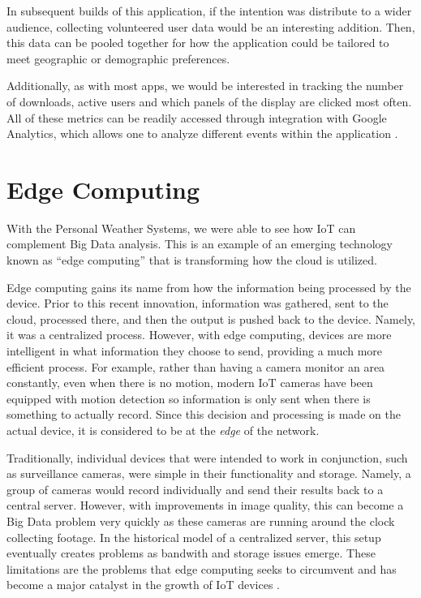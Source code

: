 \documentclass[sigconf]{acmart}
\begin{document}
In subsequent builds of this application, if the intention was distribute to a wider audience, collecting volunteered user data would be an interesting addition. Then, this data can be pooled together for how the application could be tailored to meet geographic or demographic preferences.

Additionally, as with most apps, we would be interested in tracking the number of downloads, active users and which panels of the display are clicked most often. All of these metrics can be readily accessed through integration with Google Analytics, which allows one to analyze different events within the application \cite{googleanalytics}.

\section{Edge Computing}
With the Personal Weather Systems, we were able to see how IoT can complement Big Data analysis. This is an example of an emerging technology known as ``edge computing'' that is transforming how the cloud is utilized. 

Edge computing gains its name from how the information being processed by the device.  Prior to this recent innovation, information was gathered, sent to the cloud, processed there, and then the output is pushed back to the device. Namely, it was a centralized process. However, with edge computing, devices are more intelligent in what information they choose to send, providing a much more efficient process. For example, rather than having a camera monitor an area constantly, even when there is no motion, modern IoT cameras have been equipped with motion detection so information is only sent when there is something to actually record. Since this decision and processing is made on the actual device, it is considered to be at the \emph{edge} of the network.

Traditionally, individual devices that were intended to work in conjunction, such as surveillance cameras, were simple in their functionality and storage. Namely, a group of cameras would record individually and send their results back to a central server. However, with improvements in image quality, this can become a Big Data problem very quickly as these cameras are running around the clock collecting footage. In the historical model of a centralized server, this setup eventually creates problems as bandwith and storage issues emerge. These limitations are the problems that edge computing seeks to circumvent and has become a major catalyst in the growth of IoT devices \cite{edge}.   
\end{document}
